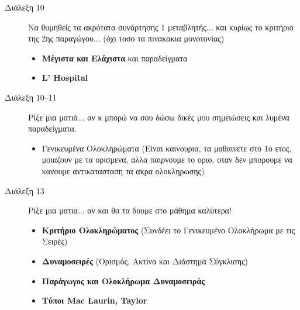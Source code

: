 \documentclass[a4paper,12pt]{article}
\begin{document}
\begin{description}
\item[Διάλεξη 10] Να θυμηθείς τα ακρότατα συνάρτησης 1 μεταβλητής...
και κυρίως το κριτήριο της 2ης παραγώγου... (όχι τοσο τα πινακακια
μονοτονίας)
\begin{itemize}
  \item \textbf{Μέγιστα και Ελάχιστα} και παραδείγματα
  \item \textbf{\textlatin{L' Hospital}}
\end{itemize}
\item[Διάλεξη 10--11] Ρίξε μια ματιά... αν κ μπορώ να σου δώσω
δικές μου σημειώσεις και λυμένα παραδείγματα.
\begin{itemize}
  \item Γενικευμένα Ολοκληρώματα (Είναι καινουρια, τα μαθαινετε στο
  1ο ετος, μοιαζουν με τα ορισμενα, αλλα παιρνουμε το οριο, οταν δεν
  μπορουμε να κανουμε αντικατασταση τα ακρα ολοκληρωσης)
\end{itemize}
\item[Διάλεξη 13] Ρίξε μια ματια... αν και θα τα δουμε στο μάθημα καλύτερα!
\begin{itemize}
  \item \textbf{Κριτήριο Ολοκληρώματος} (Συνδέει το Γενικευμένο Ολοκλήρωμα με τις
  Σειρές)
  \item \textbf{Δυναμοσειρές} (Ορισμός, Ακτίνα και Διάστημα Σύγκλισης)
  \item \textbf{Παράγωγος και Ολοκλήρωμα Δυναμοσειράς}
  \item \textbf{Τύποι \textlatin{Mac Laurin, Taylor}}
\end{itemize}

\end{description}
\end{document}
